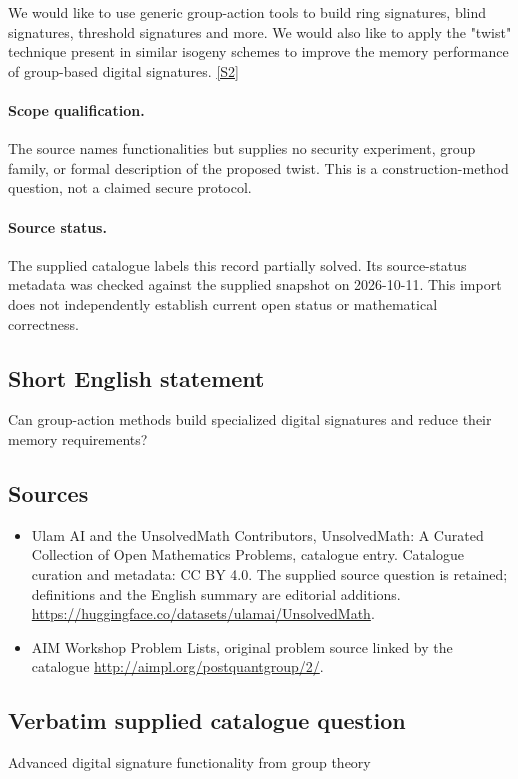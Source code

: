 \documentclass[11pt]{article}
\begin{document}
We would like to use generic group-action tools to build ring signatures, blind signatures, threshold signatures and more. We would also like to apply the "twist" technique present in similar isogeny schemes to improve the memory performance of group-based digital signatures. \href{http://aimpl.org/postquantgroup/2/}{[S2]}
\paragraph{Scope qualification.}
The source names functionalities but supplies no security experiment, group family, or formal description of the proposed twist. This is a construction-method question, not a claimed secure protocol.
\paragraph{Source status.}
The supplied catalogue labels this record partially solved. Its source-status metadata was checked against the supplied snapshot on 2026-10-11. This import does not independently establish current open status or mathematical correctness.
\subsection{Short English statement}
Can group-action methods build specialized digital signatures and reduce their memory requirements?
\subsection{Sources}
\begin{itemize}
\item[S1] Ulam AI and the UnsolvedMath Contributors, UnsolvedMath: A Curated Collection of Open Mathematics Problems, catalogue entry. Catalogue curation and metadata: CC BY 4.0. The supplied source question is retained; definitions and the English summary are editorial additions.
\url{https://huggingface.co/datasets/ulamai/UnsolvedMath}.
\item[S2] AIM Workshop Problem Lists, original problem source linked by the catalogue
\url{http://aimpl.org/postquantgroup/2/}.
\end{itemize}
\subsection{Verbatim supplied catalogue question}
Advanced digital signature functionality from group theory
\end{document}
